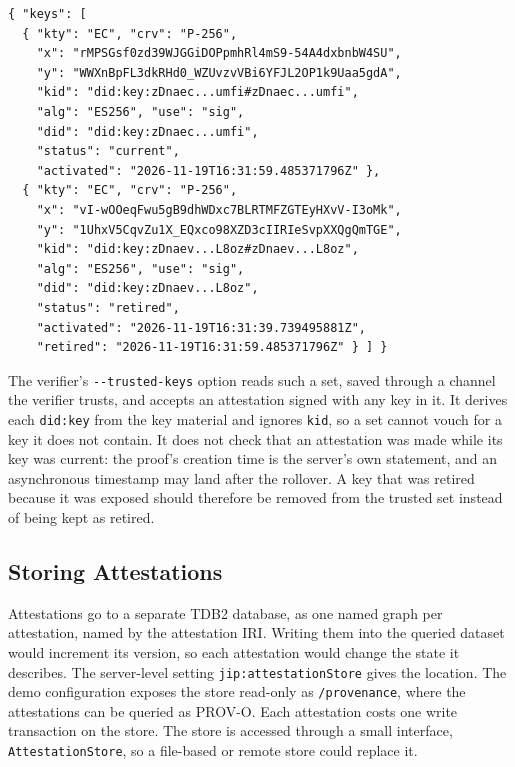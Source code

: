 \documentclass[11pt,a4paper]{article}
\newcommand{\code}[1]{\texttt{#1}}
\begin{document}
\begin{lstlisting}[basicstyle=\ttfamily\footnotesize, caption={The JWK Set returned by \code{GET /\$/provenance/keys} after the rollover in the demo (key identifiers shortened).}, label={lst:keys}]
{ "keys": [
  { "kty": "EC", "crv": "P-256",
    "x": "rMPSGsf0zd39WJGGiDOPpmhRl4mS9-54A4dxbnbW4SU",
    "y": "WWXnBpFL3dkRHd0_WZUvzvVBi6YFJL2OP1k9Uaa5gdA",
    "kid": "did:key:zDnaec...umfi#zDnaec...umfi",
    "alg": "ES256", "use": "sig",
    "did": "did:key:zDnaec...umfi",
    "status": "current",
    "activated": "2026-11-19T16:31:59.485371796Z" },
  { "kty": "EC", "crv": "P-256",
    "x": "vI-wOOeqFwu5gB9dhWDxc7BLRTMFZGTEyHXvV-I3oMk",
    "y": "1UhxV5CqvZu1X_EQxco98XZD3cIIRIeSvpXXQgQmTGE",
    "kid": "did:key:zDnaev...L8oz#zDnaev...L8oz",
    "alg": "ES256", "use": "sig",
    "did": "did:key:zDnaev...L8oz",
    "status": "retired",
    "activated": "2026-11-19T16:31:39.739495881Z",
    "retired": "2026-11-19T16:31:59.485371796Z" } ] }
\end{lstlisting}

The verifier's \code{-{}-trusted-keys} option reads such a set, saved through a channel the
verifier trusts, and accepts an attestation signed with any key in it. It derives each
\code{did:key} from the key material and ignores \code{kid}, so a set cannot vouch for a key it
does not contain. It does not check that an attestation was made while its key was current: the
proof's creation time is the server's own statement, and an asynchronous timestamp may land
after the rollover. A key that was retired because it was exposed should therefore be removed
from the trusted set instead of being kept as retired.

\subsection{Storing Attestations}
\label{sec:store}

Attestations go to a separate TDB2 database, as one named graph per attestation, named by the
attestation IRI. Writing them into the queried dataset would increment its version, so each
attestation would change the state it describes. The server-level setting
\code{jip:attestationStore} gives the location. The demo configuration exposes the store
read-only as \code{/provenance}, where the attestations can be queried as PROV-O. Each
attestation costs one write transaction on the store. The store is accessed through a small
interface, \code{AttestationStore}, so a file-based or remote store could replace it.
\end{document}
